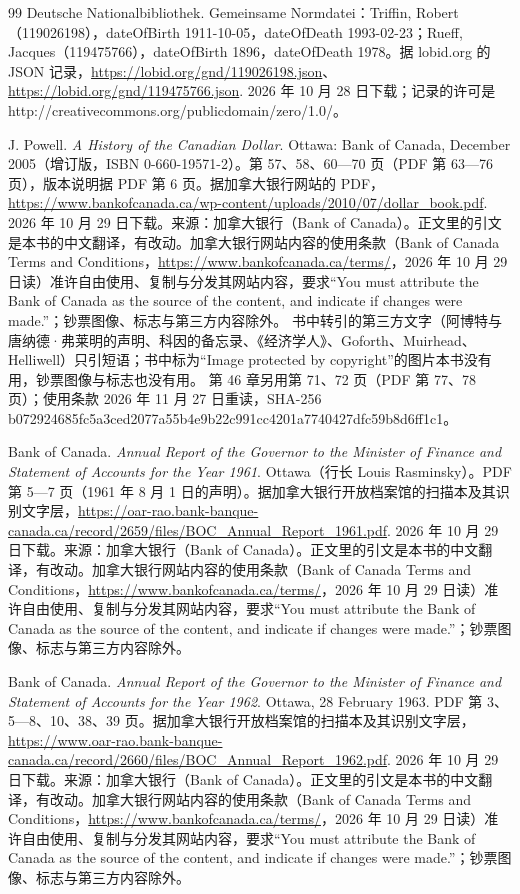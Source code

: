 \begin{thebibliography}{99}
 Deutsche Nationalbibliothek. Gemeinsame Normdatei：Triffin, Robert（119026198），dateOfBirth 1911-10-05，dateOfDeath 1993-02-23；Rueff, Jacques（119475766），dateOfBirth 1896，dateOfDeath 1978。据 lobid.org 的 JSON 记录，\url{https://lobid.org/gnd/119026198.json}、\url{https://lobid.org/gnd/119475766.json}. 2026 年 10 月 28 日下载；记录的许可是 http://creativecommons.org/publicdomain/zero/1.0/。

 J. Powell. \emph{A History of the Canadian Dollar}. Ottawa: Bank of Canada, December 2005（增订版，ISBN 0-660-19571-2）。第 57、58、60—70 页（PDF 第 63—76 页），版本说明据 PDF 第 6 页。据加拿大银行网站的 PDF，\url{https://www.bankofcanada.ca/wp-content/uploads/2010/07/dollar_book.pdf}. 2026 年 10 月 29 日下载。来源：加拿大银行（Bank of Canada）。正文里的引文是本书的中文翻译，有改动。加拿大银行网站内容的使用条款（Bank of Canada Terms and Conditions，\url{https://www.bankofcanada.ca/terms/}，2026 年 10 月 29 日读）准许自由使用、复制与分发其网站内容，要求“You must attribute the Bank of Canada as the source of the content, and indicate if changes were made.”；钞票图像、标志与第三方内容除外。 书中转引的第三方文字（阿博特与唐纳德·弗莱明的声明、科因的备忘录、《经济学人》、Goforth、Muirhead、Helliwell）只引短语；书中标为“Image protected by copyright”的图片本书没有用，钞票图像与标志也没有用。 第 46 章另用第 71、72 页（PDF 第 77、78 页）；使用条款 2026 年 11 月 27 日重读，SHA-256 b072924685fc5a3ced2077a55b4e9b22c991cc4201a7740427dfc59b8d6ff1c1。

 Bank of Canada. \emph{Annual Report of the Governor to the Minister of Finance and Statement of Accounts for the Year 1961}. Ottawa（行长 Louis Rasminsky）。PDF 第 5—7 页（1961 年 8 月 1 日的声明）。据加拿大银行开放档案馆的扫描本及其识别文字层，\url{https://oar-rao.bank-banque-canada.ca/record/2659/files/BOC_Annual_Report_1961.pdf}. 2026 年 10 月 29 日下载。来源：加拿大银行（Bank of Canada）。正文里的引文是本书的中文翻译，有改动。加拿大银行网站内容的使用条款（Bank of Canada Terms and Conditions，\url{https://www.bankofcanada.ca/terms/}，2026 年 10 月 29 日读）准许自由使用、复制与分发其网站内容，要求“You must attribute the Bank of Canada as the source of the content, and indicate if changes were made.”；钞票图像、标志与第三方内容除外。

 Bank of Canada. \emph{Annual Report of the Governor to the Minister of Finance and Statement of Accounts for the Year 1962}. Ottawa, 28 February 1963. PDF 第 3、5—8、10、38、39 页。据加拿大银行开放档案馆的扫描本及其识别文字层，\url{https://www.oar-rao.bank-banque-canada.ca/record/2660/files/BOC_Annual_Report_1962.pdf}. 2026 年 10 月 29 日下载。来源：加拿大银行（Bank of Canada）。正文里的引文是本书的中文翻译，有改动。加拿大银行网站内容的使用条款（Bank of Canada Terms and Conditions，\url{https://www.bankofcanada.ca/terms/}，2026 年 10 月 29 日读）准许自由使用、复制与分发其网站内容，要求“You must attribute the Bank of Canada as the source of the content, and indicate if changes were made.”；钞票图像、标志与第三方内容除外。


\end{thebibliography}
